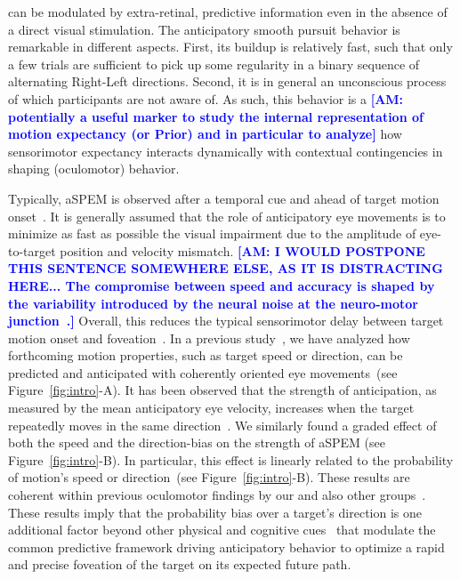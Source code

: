 \documentclass[12pt,english]{article}%
\newcommand{\citep}[1]{\parencite{#1}}
\newcommand{\seeFig}[1]{Figure~\ref{fig:#1}}
\newcommand{\AM}[1]{\textbf{\textcolor{blue}{[AM: #1]}}}
\begin{document}
can be modulated by extra-retinal, predictive information even in the absence of a direct visual stimulation.
The anticipatory smooth pursuit behavior is remarkable
in different aspects.
First, its buildup is relatively fast, such that only a few trials are sufficient
to pick up some regularity in a binary sequence of alternating Right-Left directions.
Second, it is in general an unconscious process
of which participants are not aware of.
As such, this behavior is a \AM{potentially a useful marker
to study the internal representation of motion expectancy (or Prior) and in particular to analyze} how sensorimotor expectancy interacts dynamically with contextual contingencies in shaping (oculomotor) behavior.

Typically, aSPEM is observed after a temporal cue and
ahead of target motion onset~\citep{Kowler1979a,Kowler1979b, Kowler1984}. %
It is generally assumed that the role of anticipatory eye movements is
to minimize as fast as possible the visual impairment due
to the amplitude of eye-to-target position and velocity mismatch.
\AM{I WOULD POSTPONE THIS SENTENCE SOMEWHERE ELSE, AS IT IS DISTRACTING HERE... The compromise between speed and accuracy is shaped
by the variability introduced by the neural noise
at the neuro-motor junction~\citep{Harris98}.}
Overall, this reduces the typical sensorimotor delay
between target motion onset and foveation~\citep{REFNEEDED}.
In a previous study~\citep{Montagnini2010},
we have analyzed how forthcoming motion properties,
such as target speed or direction, can be
predicted and anticipated with coherently oriented eye movements~(see \seeFig{intro}-A).
It has been observed that the strength of anticipation,
as measured by the mean anticipatory eye velocity,
increases when the target repeatedly moves in the same direction~\citep{Kowler1984, Kowler1989, Heinen2005}.
We similarly found a graded effect of both the speed and the direction-bias
on the strength of aSPEM (see \seeFig{intro}-B).
In particular, this effect is linearly related
to the probability of motion's speed or direction~(see \seeFig{intro}-B).
These results are coherent within previous oculomotor findings
by our and also other groups~\citep{SantosKowler2017}.
These results imply that the probability bias over a target's direction is
one additional factor beyond other physical and cognitive cues~\citep{Kowler2014, SantosKowler2017,Damasse18}
that modulate the common predictive framework
driving anticipatory behavior to optimize a rapid and
precise foveation of the target on its expected future path.
\end{document}
